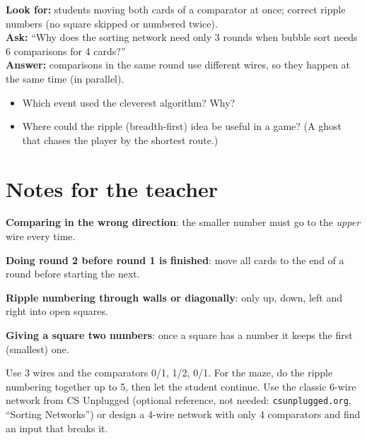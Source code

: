 \begin{formativecheck}
\textbf{Look for:} students moving both cards of a comparator at once; correct ripple numbers (no square skipped or numbered twice).\\
\textbf{Ask:} \enquote{Why does the sorting network need only 3 rounds when bubble sort needs 6 comparisons for 4 cards?}\\
\textbf{Answer:} comparisons in the same round use different wires, so they happen at the same time (in parallel).
\end{formativecheck}

\begin{reflection}[Talk]
\begin{itemize}[itemsep=1pt]
  \item Which event used the cleverest algorithm? Why?
  \item Where could the ripple (breadth-first) idea be useful in a game? (A ghost that chases the player by the shortest route.)
\end{itemize}
\end{reflection}

\section{Notes for the teacher}
\begin{commonmistakes}
  \item \textbf{Comparing in the wrong direction}: the smaller number must go to the \emph{upper} wire every time.
  \item \textbf{Doing round 2 before round 1 is finished}: move all cards to the end of a round before starting the next.
  \item \textbf{Ripple numbering through walls or diagonally}: only up, down, left and right into open squares.
  \item \textbf{Giving a square two numbers}: once a square has a number it keeps the first (smallest) one.
\end{commonmistakes}

\begin{differentiation}
\supportpath Use 3 wires and the comparators 0/1, 1/2, 0/1. For the maze, do the ripple numbering together up to 5, then let the student continue.
\extensionpath Use the classic 6-wire network from CS Unplugged (optional reference, not needed: \texttt{csunplugged.org}, \enquote{Sorting Networks}) or design a 4-wire network with only 4 comparators and find an input that breaks it.
\end{differentiation}

